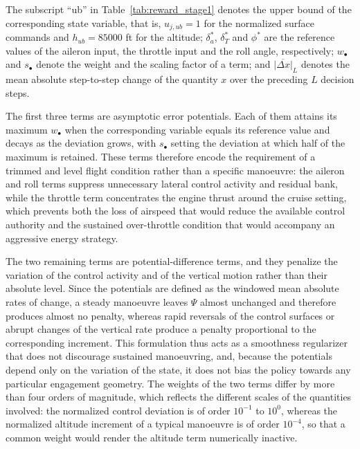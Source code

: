 \documentclass[pdflatex,sn-mathphys-num]{sn-jnl}%
\theoremstyle{thmstyleone}%
\theoremstyle{thmstyletwo}%
\theoremstyle{thmstylethree}%
\begin{document}
The subscript ``ub'' in Table~\ref{tab:reward_stage1} denotes the upper bound of the corresponding state variable, that is, $u_{j,ub}=1$ for the normalized surface commands and $h_{ub}=85000$ ft for the altitude; $\delta_a^{\ast}$, $\delta_T^{\ast}$ and $\phi^{\ast}$ are the reference values of the aileron input, the throttle input and the roll angle, respectively; $w_{\bullet}$ and $s_{\bullet}$ denote the weight and the scaling factor of a term; and $\overline{|\Delta x|}_{L}$ denotes the mean absolute step-to-step change of the quantity $x$ over the preceding $L$ decision steps.

The first three terms are asymptotic error potentials. Each of them attains its maximum $w_{\bullet}$ when the corresponding variable equals its reference value and decays as the deviation grows, with $s_{\bullet}$ setting the deviation at which half of the maximum is retained. These terms therefore encode the requirement of a trimmed and level flight condition rather than a specific manoeuvre: the aileron and roll terms suppress unnecessary lateral control activity and residual bank, while the throttle term concentrates the engine thrust around the cruise setting, which prevents both the loss of airspeed that would reduce the available control authority and the sustained over-throttle condition that would accompany an aggressive energy strategy.

The two remaining terms are potential-difference terms, and they penalize the variation of the control activity and of the vertical motion rather than their absolute level. Since the potentials are defined as the windowed mean absolute rates of change, a steady manoeuvre leaves $\Psi$ almost unchanged and therefore produces almost no penalty, whereas rapid reversals of the control surfaces or abrupt changes of the vertical rate produce a penalty proportional to the corresponding increment. This formulation thus acts as a smoothness regularizer that does not discourage sustained manoeuvring, and, because the potentials depend only on the variation of the state, it does not bias the policy towards any particular engagement geometry. The weights of the two terms differ by more than four orders of magnitude, which reflects the different scales of the quantities involved: the normalized control deviation is of order $10^{-1}$ to $10^{0}$, whereas the normalized altitude increment of a typical manoeuvre is of order $10^{-4}$, so that a common weight would render the altitude term numerically inactive.
\end{document}
